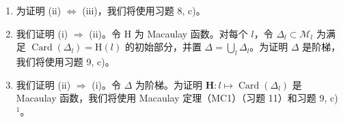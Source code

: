 \begin{enumerate}
\def\labelenumi{\alph{enumi})}
\item
  为证明 (ii) \(\Leftrightarrow\) (iii)，我们将使用习题 8, c)。
\item
  我们证明 (i) \(\Rightarrow\) (ii)。令 H 为 Macaulay 函数。对每个 \(l\)，令 \(\Delta_l \subset \mathcal{M}_l\) 为满足 \(\operatorname{Card}(\Delta_l) = \mathrm{H}(l)\) 的初始部分，并置 \(\Delta = \bigcup_{l} \Delta_l\)。为证明 \(\Delta\) 是阶梯，我们将使用习题 9, c)。
\item
  我们证明 (ii) \(\Rightarrow\) (i)。令 \(\Delta\) 为阶梯。为证明 \(\mathbf{H}: l \mapsto \operatorname{Card}(\Delta_l)\) 是 Macaulay 函数，我们将使用 Macaulay 定理（MC1）（习题 11）和习题 9, c) \(^{1}\)。
\end{enumerate}
\relax{}
